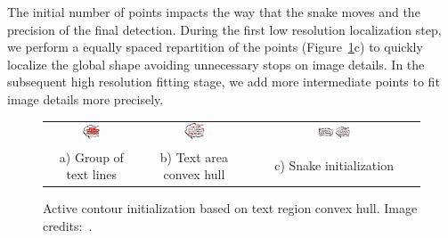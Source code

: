 

The initial number of points impacts the way that the snake moves and the precision of the final detection.
During the first low resolution localization step, we perform a equally spaced repartition of the points (Figure~\ref{fig:se:paragraphs}c) to quickly localize the global shape avoiding unnecessary stops on image details.
In the subsequent high resolution fitting stage, we add more intermediate points to fit image details more precisely.

	\begin{figure}[!ht]%
	\begin{center}
	  \begin{tabular}{ccc}
	  \includegraphics[trim= 0mm 0mm 0mm 0mm, clip, width=0.20\textwidth]{group_lines.png}&
	  \includegraphics[trim= 0mm 0mm 0mm 0mm, clip, width=0.20\textwidth]{convex_hull.png}&
	  \includegraphics[trim= 48mm 0mm 0mm 0mm, clip, width=0.20\textwidth]{snake_init.png} \\ 
	  \footnotesize a) Group of text lines	& \footnotesize b) Text area convex hull 	& \footnotesize c) Snake initialization 
	  \end{tabular}
	\caption[Active contour initialization based on text region convex hull]{Active contour initialization based on text region convex hull. Image credits:~\cite{Bubble09}.}
		\label{fig:se:paragraphs}
	\end{center}
	\end{figure}	


